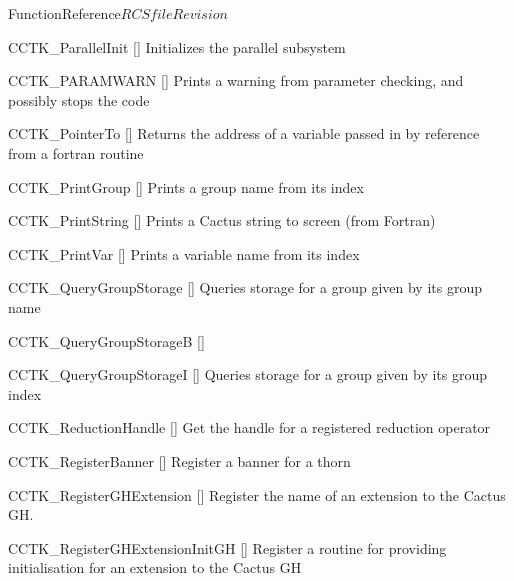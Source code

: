 \begin{cactuspart}{FunctionReference}{$RCSfile$}{$Revision$}
\begin{Lentry}
\item[CCTK\_ParallelInit]
  [\pageref{CCTK-ParallelInit}]
  Initializes the parallel subsystem

\item[CCTK\_PARAMWARN]
  [\pageref{CCTK-PARAMWARN}]
  Prints a warning from parameter checking, and possibly stops the code

\item[CCTK\_PointerTo]
  [\pageref{CCTK-PointerTo}]
  Returns the address of a variable passed in by reference from a fortran routine

\item[CCTK\_PrintGroup]
  [\pageref{CCTK-PrintGroup}]
  Prints a group name from its index

\item[CCTK\_PrintString]
  [\pageref{CCTK-PrintString}]
  Prints a Cactus string to screen (from Fortran)

\item[CCTK\_PrintVar]
  [\pageref{CCTK-PrintVar}]
  Prints a variable name from its index

\item[CCTK\_QueryGroupStorage]
  [\pageref{CCTK-QueryGroupStorage}]
  Queries storage for a group given by its group name

\item[CCTK\_QueryGroupStorageB]
  [\pageref{CCTK-QueryGroupStorageB}]


\item[CCTK\_QueryGroupStorageI]
  [\pageref{CCTK-QueryGroupStorageI}]
  Queries storage for a group given by its group index



\item[CCTK\_ReductionHandle]
  [\pageref{CCTK-ReductionHandle}]
  Get the handle for a registered reduction operator

\item[CCTK\_RegisterBanner]
  [\pageref{CCTK-RegisterBanner}]
  Register a banner for a thorn

\item[CCTK\_RegisterGHExtension]
  [\pageref{CCTK-RegisterGHExtension}]
  Register the name of an extension to the Cactus GH.

\item[CCTK\_RegisterGHExtensionInitGH]
  [\pageref{CCTK-RegisterGHExtensionInitGH}]
  Register a routine for providing initialisation for an extension to the Cactus GH


\end{Lentry}
\end{cactuspart}
